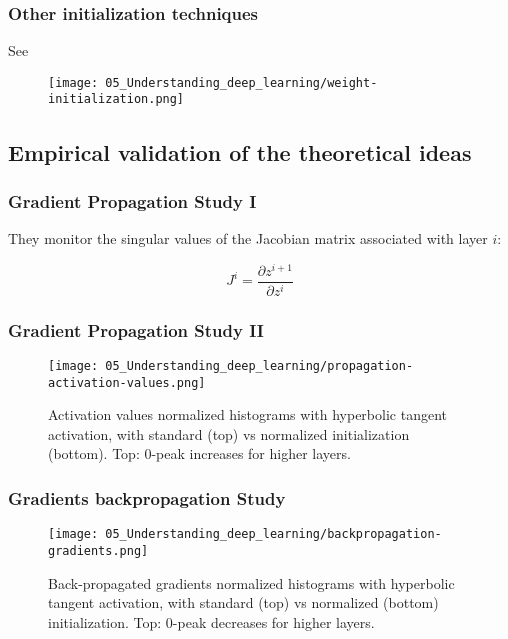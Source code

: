 \begin{frame}
  \frametitle{Other initialization techniques}
  See \cite{WeightInitialization}

  
  \begin{figure}[t]
    \texttt{[image: 05\_Understanding\_deep\_learning/weight-initialization.png]}
    \centering
\end{figure}
\end{frame}

\subsection{Empirical validation of the theoretical ideas}

\begin{frame}
  \frametitle{Gradient Propagation Study I}
They  monitor the singular values of the Jacobian matrix associated with layer $i$:
  
\begin{equation}
  J^i 
  = 
  \frac{\partial z^{i+1}}{\partial z^i}
\end{equation}

\end{frame}

\begin{frame}
  \frametitle{Gradient Propagation Study II}

  \begin{figure}[t]
    \texttt{[image: 05\_Understanding\_deep\_learning/propagation-activation-values.png]}
    \caption{Activation values normalized histograms with hyperbolic tangent activation, with standard (top) vs normalized initialization (bottom). Top: 0-peak increases for higher layers.}
    \centering
\end{figure}

\end{frame}

\begin{frame}
  \frametitle{Gradients backpropagation Study }

  \begin{figure}[t]
    \texttt{[image: 05\_Understanding\_deep\_learning/backpropagation-gradients.png]}
    \caption{Back-propagated gradients normalized histograms with hyperbolic tangent activation, with standard (top) vs normalized (bottom) initialization. Top: 0-peak decreases for higher layers.}
    \centering
\end{figure}

\end{frame}

